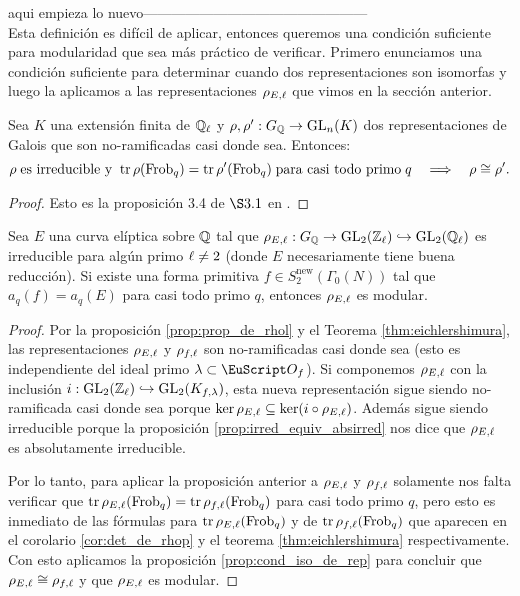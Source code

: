 \documentclass[../../tesis_maestria]{subfiles}
\begin{document}
aqui empieza lo nuevo------------------------------------------------
\\

Esta definici\'on es dif\'icil de aplicar, entonces queremos una condici\'on suficiente para modularidad que sea m\'as pr\'actico de verificar. Primero enunciamos una condici\'on suficiente para determinar cuando dos representaciones son isomorfas  y luego la aplicamos a las representaciones $\rho_{E,\ell}$ que vimos en la secci\'on anterior.

\begin{prop}\label{prop:cond_iso_de_rep}
  Sea $K$ una extensi\'on finita de $\mathbb{Q}_\ell$ y $\rho,\rho':G_{\mathbb{Q}}\rightarrow\mathrm{GL}_n(K)$ dos representaciones de Galois que son no-ramificadas casi donde sea. Entonces:
  \[
    \rho\;\text{es irreducible y}\;\;
    \mathrm{tr}\,\rho(\mathrm{Frob}_q)=\mathrm{tr}\,\rho'(\mathrm{Frob}_q)\;\text{para casi todo primo}\; q
    \quad\Longrightarrow\quad \rho\cong\rho'.
  \]
\end{prop}
\begin{proof}
  Esto es la proposici\'on 3.4 de $\S3.1$ en \cite{SaitoFLTTP}.
\end{proof}

\begin{cor}\label{cor:modularidad_rhol}
  Sea $E$ una curva el\'iptica sobre $\mathbb{Q}$ tal que $\rho_{E,\ell}:G_{\mathbb{Q}}\rightarrow\mathrm{GL}_2(\mathbb{Z}_\ell)\hookrightarrow\mathrm{GL}_2(\mathbb{Q}_\ell)$ es irreducible para alg\'un primo $\ell\neq2$ (donde $E$ necesariamente tiene buena reducci\'on). Si existe una forma primitiva $f\in S^{\mathrm{new}}_2(\Gamma_0(N))$ tal que $a_q(f)=a_q(E)$ para casi todo primo $q$, entonces $\rho_{E,\ell}$ es modular.
\end{cor}
\begin{proof}
  Por la proposici\'on \ref{prop:prop_de_rhol} y el Teorema \ref{thm:eichlershimura}, las representaciones $\rho_{E,\ell}$ y $\rho_{f,\ell}$ son no-ramificadas casi donde sea (esto es independiente del ideal primo $\la\subset\Oo_f$). Si componemos $\rho_{E,\ell}$ con la inclusi\'on $i:\mathrm{GL}_2(\mathbb{Z}_\ell)\hookrightarrow\mathrm{GL}_2(K_{f,\lambda})$, esta nueva representaci\'on sigue siendo no-ramificada casi donde sea porque $\ker\rho_{E,\ell}\subseteq\ker(i\circ\rho_{E,\ell})$. Adem\'as sigue siendo irreducible porque la proposici\'on \ref{prop:irred_equiv_absirred} nos dice que $\rho_{E,\ell}$ es absolutamente irreducible.
  
  Por lo tanto, para aplicar la proposici\'on anterior a $\rho_{E,\ell}$ y $\rho_{f,\ell}$ solamente nos falta verificar que $\mathrm{tr}\,\rho_{E,\ell}(\mathrm{Frob}_q)=\mathrm{tr}\,\rho_{f,\ell}(\mathrm{Frob}_q)$ para casi todo primo $q$, pero esto es inmediato de las f\'ormulas para $\mathrm{tr}\,\rho_{E,\ell}(\mathrm{Frob}_q)$ y de $\mathrm{tr}\,\rho_{f,\ell}(\mathrm{Frob}_q)$ que aparecen en el corolario \ref{cor:det_de_rhop} y el teorema \ref{thm:eichlershimura} respectivamente. Con esto aplicamos la proposici\'on \ref{prop:cond_iso_de_rep} para concluir que $\rho_{E,\ell}\cong\rho_{f,\ell}$ y que $\rho_{E,\ell}$ es modular.
\end{proof}
\end{document}
